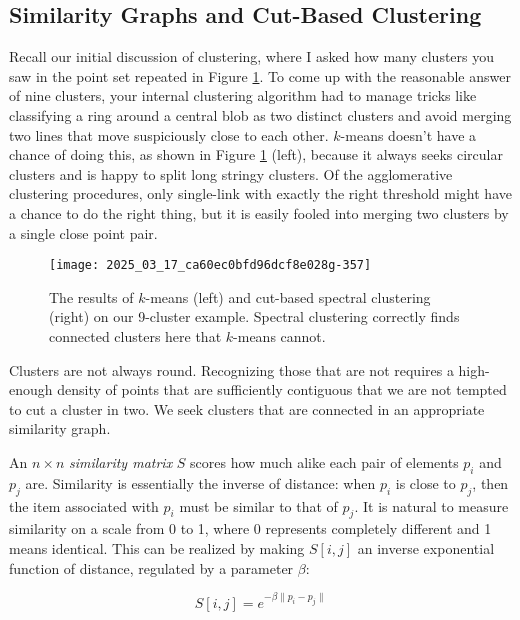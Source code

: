\documentclass[10pt]{article}
\begin{document}
\subsection{Similarity Graphs and Cut-Based Clustering}

Recall our initial discussion of clustering, where I asked how many clusters you saw in the point set repeated in Figure \ref{fig:kmeans_vs_spectral}. To come up with the reasonable answer of nine clusters, your internal clustering algorithm had to manage tricks like classifying a ring around a central blob as two distinct clusters and avoid merging two lines that move suspiciously close to each other. $k$-means doesn't have a chance of doing this, as shown in Figure \ref{fig:kmeans_vs_spectral} (left), because it always seeks circular clusters and is happy to split long stringy clusters. Of the agglomerative clustering procedures, only single-link with exactly the right threshold might have a chance to do the right thing, but it is easily fooled into merging two clusters by a single close point pair.

\begin{figure}[H]
    \centering
    \texttt{[image: 2025\_03\_17\_ca60ec0bfd96dcf8e028g-357]}
    \caption{The results of $k$-means (left) and cut-based spectral clustering (right) on our 9-cluster example. Spectral clustering correctly finds connected clusters here that $k$-means cannot.}
    \label{fig:kmeans_vs_spectral}
\end{figure}

Clusters are not always round. Recognizing those that are not requires a high-enough density of points that are sufficiently contiguous that we are not tempted to cut a cluster in two. We seek clusters that are connected in an appropriate similarity graph.

An $n \times n$ \emph{similarity matrix} $S$ scores how much alike each pair of elements $p_{i}$ and $p_{j}$ are. Similarity is essentially the inverse of distance: when $p_{i}$ is close to $p_{j}$, then the item associated with $p_{i}$ must be similar to that of $p_{j}$. It is natural to measure similarity on a scale from 0 to 1, where 0 represents completely different and 1 means identical. This can be realized by making $S[i, j]$ an inverse exponential function of distance, regulated by a parameter $\beta$:

\[
S[i, j]=e^{-\beta\|p_{i}-p_{j}\|}
\]
\end{document}
